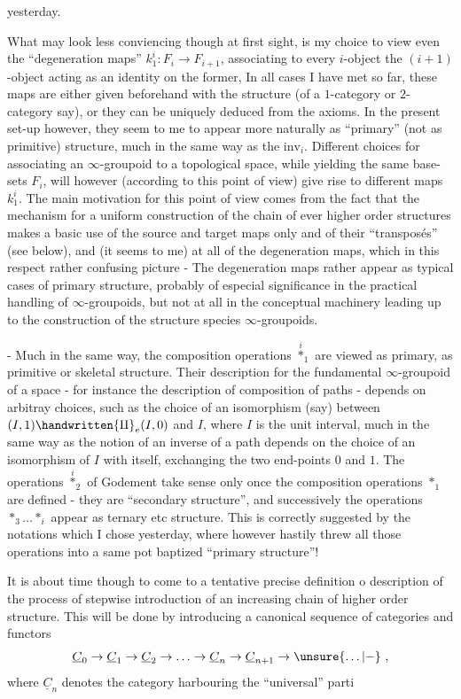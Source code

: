 yesterday.

What may look less conviencing though at first sight, is my choice to view  even the ``degeneration maps'' $k_1^i:F_i\to F_{i+1}$, associating to every $i$-object the $(i+1)$-object acting as an identity on the former, In all cases I have met so far, these maps are either given beforehand with the structure (of a $1$-category or $2$-category say), or they can be uniquely deduced from the axioms. In the present set-up however, they seem to me to appear more naturally as ``primary'' (not as primitive) structure, much in the same way as the $\mathrm{inv}_i$. Different choices for associating an $\infty$-groupoid to a topological space, while yielding the same base-sets $F_i$, will however (according to this point of view) give rise to different maps $k_1^i$. The main motivation for this point of view comes from the fact that the mechanism for a uniform construction of the chain of ever higher order structures makes a basic use of the source and target maps only and of their ``transposés'' (see below), and (it seems to me)  at all of the degeneration maps, which in this respect rather  confusing  picture\handwritten{,}  - The degeneration maps rather appear as typical cases of primary structure, probably of especial significance in the practical handling of $\infty$-groupoids, but not at all in the conceptual machinery leading up to the construction of the structure species  $\infty$-groupoids.

- Much in the same way, the composition operations $\overset{i}{*}_1$ are viewed as primary,  as primitive or skeletal structure. Their description for the fundamental $\infty$-groupoid of a space - for instance the description of composition of paths - depends on arbitray choices, such as the choice of an isomorphism (say) between $(I,1)\handwritten{\amalg}_e(I,0)$ and $I$, where $I$ is the unit interval, much in the same way as the notion of an inverse of a path depends on the choice of an isomorphism of $I$ with itself, exchanging the two end-points $0$ and $1$. The operations $\overset{i}{*}_2$ of Godement take sense only once the composition operations $*_1$ are defined - they are ``secondary structure'', and successively the operations $*_3\ldots *_i$ appear as ternary etc structure. This is correctly suggested by the notations which I chose yesterday, where however  hastily threw all those operations into a same pot baptized ``primary structure''!

It is about time though to come to a tentative precise definition o description of the process of stepwise introduction of an increasing chain of higher order structure. This will be done by introducing a canonical sequence of categories and functors
\[
\underline{C}_0\to\underline{C}_1\to\underline{C}_2\to\ldots\to\underline{C}_n\to\underline{C}_{n+1}\to\unsure{\ldots|-}\ ,
\]
where $\underline{C}_n$ denotes the  category harbouring the ``universal'' parti%
